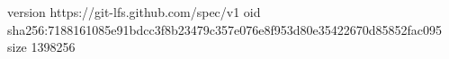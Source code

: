version https://git-lfs.github.com/spec/v1
oid sha256:7188161085e91bdcc3f8b23479c357e076e8f953d80e35422670d85852fac095
size 1398256

